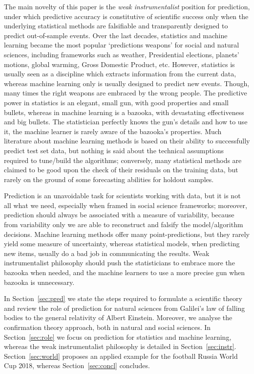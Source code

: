 \documentclass{statsoc}
\begin{document}
 The main novelty of this paper is the \emph{weak instrumentalist} position for prediction, under which predictive accuracy is constitutive of scientific success only when the 
underlying statistical methods are falsifiable and transparently designed to predict out-of-sample events. Over the last decades, statistics and machine learning became the most popular `predictions weapons' for social and natural sciences, including frameworks such as weather, Presidential elections, planets' motions, global warming, Gross Domestic Product, etc. However, statistics is usually seen as a discipline which extracts information from the current data, whereas machine learning only is usually designed to predict new events.  Though, many times the right weapons are embraced by the wrong people. The predictive power in statistics is an elegant, small 
gun, with good properties and small bullets, whereas in machine learning is a bazooka, with devastating effectiveness and big bullets. The statistician perfectly knows the gun's details and how to use it, the machine learner is rarely aware of the bazooka's properties. Much literature about machine learning methods \citep{breiman2001statistical} is based on their ability to successfully predict test set 
data, but nothing is said about the technical assumptions required to tune/build the algorithms; conversely, many statistical methods are claimed to be good upon the check of 
their residuals on the training data, but rarely on the ground of some forecasting abilities for holdout samples.  

Prediction is an unavoidable task for scientists working 
with data, but it is not all what we need, especially when framed in social science frameworks; moreover, prediction should always be associated with a measure of variability, because from variability only we are able to reconstruct and 
falsify the model/algorithm decisions. Machine learning methods offer many point-predictions,  but they rarely yield some measure of uncertainty, whereas statistical 
models, when predicting new items, usually do a bad job in communicating the results. Weak instrumentalist philosophy should push the statisticians to embrace more the bazooka when needed, and the machine learners to use a more precise gun when bazooka is unnecessary.

In Section~\ref{sec:pred} we state the steps required to formulate a scientific theory and review the role of prediction for natural sciences from Galilei's law of falling bodies to 
the general relativity of Albert Einstein. Moreover, we analyse the confirmation theory approach, both in natural and social sciences. In Section~\ref{sec:role} we focus on 
prediction for statistics and machine learning, whereas the weak instrumentalist philosophy is detailed in Section~\ref{sec:instr}. Section~\ref{sec:world} proposes an applied example for the football Russia World Cup 2018, whereas Section~\ref{sec:concl} concludes.
\end{document}
